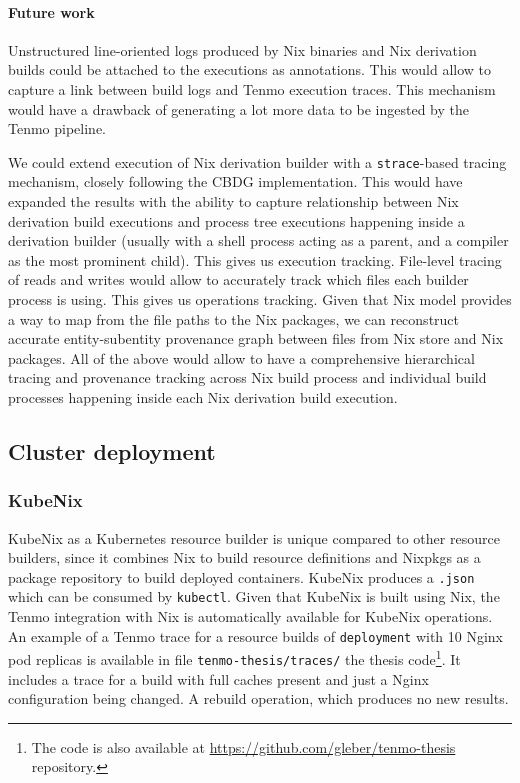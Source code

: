 \paragraph*{Future work}


Unstructured line-oriented logs produced by Nix binaries and Nix derivation builds could be attached to the executions as annotations. This would allow to capture a link between build logs and Tenmo execution traces. This mechanism would have a drawback of generating a lot more data to be ingested by the Tenmo pipeline.

We could extend execution of Nix derivation builder with a \texttt{strace}-based tracing mechanism, closely following the CBDG implementation. This would have expanded the results with the ability to capture relationship between Nix derivation build executions and process tree executions happening inside a derivation builder (usually with a shell process acting as a parent, and a compiler as the most prominent child). This gives us execution tracking. File-level tracing of reads and writes would allow to accurately track which files each builder process is using. This gives us operations tracking. Given that Nix model provides a way to map from the file paths to the Nix packages, we can reconstruct accurate entity-subentity provenance graph between files from Nix store and Nix packages. All of the above would allow to have a comprehensive hierarchical tracing and provenance tracking across Nix build process and individual build processes happening inside each Nix derivation build execution.

\subsection{Cluster deployment}

\subsubsection{KubeNix}\label{sec:kubenix}

KubeNix as a Kubernetes resource builder is unique compared to other resource builders, since it combines Nix to build resource definitions and Nixpkgs as a package repository to build deployed containers. KubeNix produces a \texttt{.json} which can be consumed by \texttt{kubectl}. Given that KubeNix is built using Nix, the Tenmo integration with Nix is automatically available for KubeNix operations. An example of a Tenmo trace for a resource builds of \texttt{deployment} with 10 Nginx pod replicas is available in file \texttt{tenmo-thesis/traces/} the thesis code\footnote{The code is also available at \url{https://github.com/gleber/tenmo-thesis} repository.}. It includes a trace for a build with full caches present and just a Nginx configuration being changed. A rebuild operation, which produces no new results.

